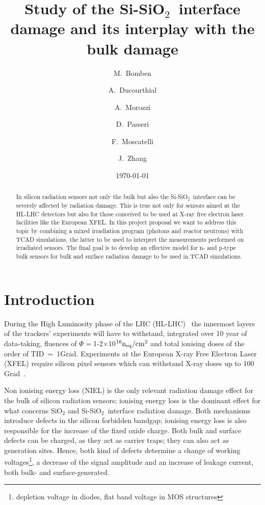\documentclass[dvips,12pt]{article}
\begin{document}
\title{Study of the Si-SiO$_2$~interface damage and its interplay with the bulk damage}
\author{M.~Bomben}
\author{A.~Ducourthial}
\author{A.~Morozzi}
\author{D.~Passeri} 
\author{F.~Moscatelli} 
\author{J.~Zhang}



\date{\today}



\maketitle

\begin{abstract}
In silicon radiation sensors not only the bulk but also the Si-SiO$_2$~interface can be severely 
affected by radiation damage. This is true not only for sensors aimed at the HL-LHC detectors 
but also for those conceived to be used at X-ray free electron laser facilities like the European XFEL. 
In this project proposal we want to address this topic by combining a mixed irradiation program 
(photons and reactor neutrons) with TCAD simulations, the latter to be used to interpret the 
measurements performed on irradiated sensors. The final goal is to develop an effective model 
for n- and p-type bulk sensors for bulk and surface radiation damage to be used in TCAD 
simulations.

\end{abstract}


\section{Introduction}

During the High Luminosity phase of the LHC (HL-LHC)~\cite{HL-LHC} the innermost layers of 
 the trackers' experiments will have to 
withstand, integrated over 10 year of data-taking,
  fluences of $\Phi = $1-2$\times$10$^{16}{\rm n_{eq}/cm^2}$  and total ionising doses of the order 
  of  
 TID~=~1Grad. Experiments at the European X-ray Free Electron Laser (XFEL) require silicon 
 pixel sensors which can withstand X-ray doses up to 100 Grad~\cite{zhang-thesis}.
 
 Non ionising energy loss (NIEL) is the only relevant radiation damage effect for the 
 bulk of silicon radiation sensors; ionising energy loss is the dominant effect for what concerns 
 SiO$_2$ and Si-SiO$_2$~interface radiation damage.
 Both mechanisms introduce defects in the silicon forbidden bandgap; ionising energy loss is 
 also responsible for the increase of the fixed oxide charge. Both bulk and surface defects 
 can be charged, as they act as carrier traps; they can also act as generation sites. Hence, 
 both kind of defects determine a change of working 
 voltages\footnote{depletion voltage in diodes, flat band voltage in MOS structures}, a decrease 
 of the signal amplitude and an increase of leakage current, both bulk- and surface-generated.
\end{document}
